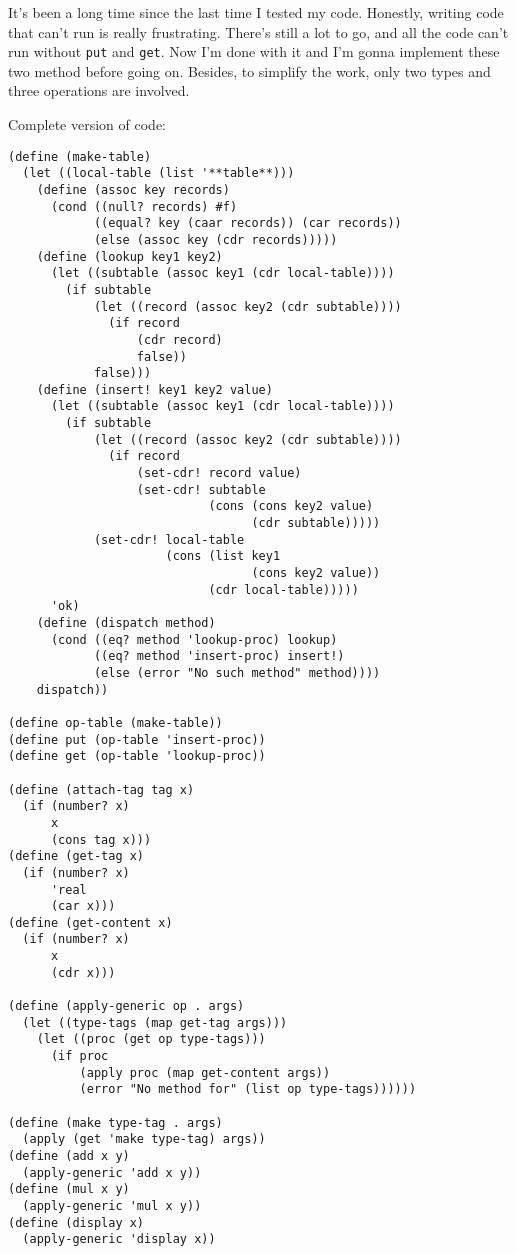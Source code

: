 \documentclass[../main.tex]{subfiles}
\begin{document}
It's been a long time since the last time I tested my code.
 Honestly, writing code that can't run is really frustrating.
 There's still a lot to go, and all the code can't run without
 \lstinline{put} and \lstinline{get}. Now I'm done with it
 and I'm gonna implement these two method before going on.
 Besides, to simplify the work, only two types and three operations
 are involved.

Complete version of code:

\begin{lstlisting}
(define (make-table)
  (let ((local-table (list '**table**)))
    (define (assoc key records)
      (cond ((null? records) #f)
            ((equal? key (caar records)) (car records))
            (else (assoc key (cdr records)))))
    (define (lookup key1 key2)
      (let ((subtable (assoc key1 (cdr local-table))))
        (if subtable
            (let ((record (assoc key2 (cdr subtable))))
              (if record
                  (cdr record)
                  false))
            false)))
    (define (insert! key1 key2 value)
      (let ((subtable (assoc key1 (cdr local-table))))
        (if subtable
            (let ((record (assoc key2 (cdr subtable))))
              (if record
                  (set-cdr! record value)
                  (set-cdr! subtable
                            (cons (cons key2 value)
                                  (cdr subtable)))))
            (set-cdr! local-table
                      (cons (list key1
                                  (cons key2 value))
                            (cdr local-table)))))
      'ok)
    (define (dispatch method)
      (cond ((eq? method 'lookup-proc) lookup)
            ((eq? method 'insert-proc) insert!)
            (else (error "No such method" method))))
    dispatch))

(define op-table (make-table))
(define put (op-table 'insert-proc))
(define get (op-table 'lookup-proc))

(define (attach-tag tag x)
  (if (number? x)
      x
      (cons tag x)))
(define (get-tag x)
  (if (number? x)
      'real
      (car x)))
(define (get-content x)
  (if (number? x)
      x
      (cdr x)))

(define (apply-generic op . args)
  (let ((type-tags (map get-tag args)))
    (let ((proc (get op type-tags)))
      (if proc
          (apply proc (map get-content args))
          (error "No method for" (list op type-tags))))))

(define (make type-tag . args)
  (apply (get 'make type-tag) args))
(define (add x y)
  (apply-generic 'add x y))
(define (mul x y)
  (apply-generic 'mul x y))
(define (display x)
  (apply-generic 'display x))


\end{lstlisting}
\end{document}
